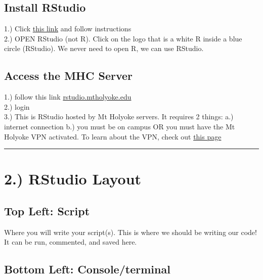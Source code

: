 \documentclass[
  letterpaper,
  DIV=11,
  numbers=noendperiod]{scrartcl}
\begin{document}
\subsection{\texorpdfstring{\textbf{Install RStudio}}{Install RStudio}}

1.) Click
\href{https://www.rstudio.com/products/rstudio/download/\#download}{this
link} and follow instructions\\
2.) OPEN RStudio (not R). Click on the logo that is a white R inside a
blue circle (RStudio). We never need to open R, we can use RStudio.

\subsection{\texorpdfstring{\textbf{Access the MHC
Server}}{Access the MHC Server}}

1.) follow this link
\href{https://rstudio.mtholyoke.edu}{rstudio.mtholyoke.edu}\\
2.) login\\
3.) This is RStudio hosted by Mt Holyoke servers. It requires 2 things:
a.) internet connection b.) you must be on campus OR you must have the
Mt Holyoke VPN activated. To learn about the VPN, check out
\href{https://lits.mtholyoke.edu/tech-support/access-and-internet-connectivity/connect-campus/using-virtual-private-network-vpn}{this
page}

\begin{center}\rule{0.5\linewidth}{0.5pt}\end{center}

\hypertarget{rstudio-layout}{%
\section{\texorpdfstring{\textbf{2.) RStudio
Layout}}{2.) RStudio Layout}}\label{rstudio-layout}}

\subsection{\texorpdfstring{\textbf{Top Left}:
Script}{Top Left: Script}}

Where you will write your script(s). This is where we should be writing
our code! It can be run, commented, and saved here.

\subsection{\texorpdfstring{\textbf{Bottom Left}:
Console/terminal}{Bottom Left: Console/terminal}}
\end{document}

